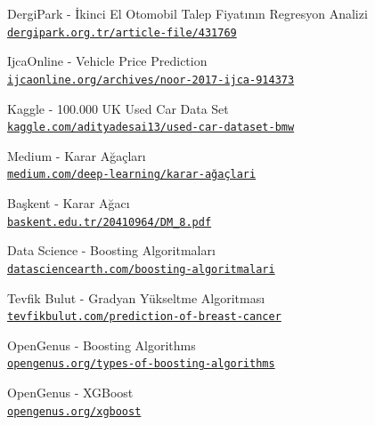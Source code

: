 \documentclass[conference]{IEEEtran}
\begin{document}
\begin{thebibliography}{17}

DergiPark - İkinci El Otomobil Talep Fiyatının Regresyon Analizi
\\\texttt{\href{https://dergipark.org.tr/tr/download/article-file/431769}{\nolinkurl{dergipark.org.tr/article-file/431769}}}

IjcaOnline - Vehicle Price Prediction
\\\texttt{\href{https://www.ijcaonline.org/archives/volume167/number9/noor-2017-ijca-914373.pdf}{\nolinkurl{ijcaonline.org/archives/noor-2017-ijca-914373}}}

Kaggle - 100.000 UK Used Car Data Set
\\\texttt{\href{https://www.kaggle.com/adityadesai13/used-car-dataset-ford-and-mercedes?select=bmw.csv}{\nolinkurl{kaggle.com/adityadesai13/used-car-dataset-bmw}}}

Medium - Karar Ağaçları
\\\texttt{\href{https://medium.com/deep-learning-turkiye/karar-ağaçları-makine-öğrenmesi-serisi-3-a03f3ff00ba5}{\nolinkurl{medium.com/deep-learning/karar-ağaçlari}}}

Başkent - Karar Ağacı
\\\texttt{\href{http://mail.baskent.edu.tr/~20410964/DM_8.pdf}{\nolinkurl{baskent.edu.tr/20410964/DM_8.pdf}}}

Data Science - Boosting Algoritmaları
\\\texttt{\href{https://www.datasciencearth.com/boosting-algoritmalari/}{\nolinkurl{datasciencearth.com/boosting-algoritmalari}}}

Tevfik Bulut - Gradyan Yükseltme Algoritması
\\\texttt{\href{https://tevfikbulut.com/2020/06/27/topluluk-ogrenme-algoritmalarindan-gradyan-yukseltme-algoritmasi-ile-gogus-kanserinin-tahmini-uzerine-bir-vaka-calismasi-a-case-study-on-the-prediction-of-breast-cancer-using-gradient-boosting-algori/}{\nolinkurl{tevfikbulut.com/prediction-of-breast-cancer}}}

OpenGenus - Boosting Algorithms
\\\texttt{\href{https://iq.opengenus.org/types-of-boosting-algorithms/}{\nolinkurl{opengenus.org/types-of-boosting-algorithms}}}

OpenGenus - XGBoost
\\\texttt{\href{https://iq.opengenus.org/xgboost/}{\nolinkurl{opengenus.org/xgboost}}}


\end{thebibliography}
\end{document}
